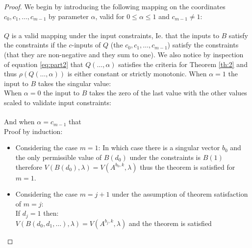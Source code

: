 \begin{proof}
We begin by introducing the following mapping on the coordinates $c_0,c_1,\dots,c_{m-1}$ by parameter $\alpha$, valid for $0\le\alpha\le 1$ and $c_{m-1}\ne 1$:\\
\\
$Q$ is a valid mapping under the input constraints, Ie. that the inputs to $B$ satisfy the constraints if the $c$-inputs of $Q$ (the $c_0,c_1,\dots,c_{m-1}$) satisfy the constraints (that they are non-negative and they sum to one).
We also notice by inspection of equation \ref{eq:part2} that $Q(\dots,\alpha)$ satisfies the criteria for Theorem \ref{th:2} and thus $\rho(Q(\dots,\alpha))$ is either constant or strictly monotonic.
When $\alpha=1$ the input to $B$ takes the singular value: \\
When $\alpha=0$ the input to $B$ takes the zero of the last value with the other values scaled to validate input constraints: \\\\
And when $\alpha=c_{m-1}$ that \\
Proof by induction:
\begin{itemize}[leftmargin=*,labelsep=4mm]
\item	Considering the case $m=1$: In which case there is a singular vector $b_0$ and the only permissible value of $B(d_0)$ under the constraints is $B(1)$ therefore $V(B(d_0),\lambda) = V(A^{b_0,k},\lambda)$ thus the theorem is satisfied for $m=1$.
\item   Considering the case $m=j+1$ under the assumption of theorem satisfaction of $m=j$:\\
\-\hspace{4mm}If $d_j=1$ then:\\
\-\hspace{8mm}$V(B(d_0,d_1,\dots),\lambda) = V(A^{b_j,k},\lambda)$ and the theorem is satisfied\\

\end{itemize}
\end{proof}
